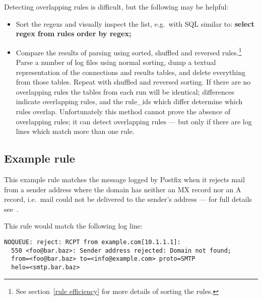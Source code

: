 \documentclass[a4paper,12pt,draft]{article}
\begin{document}
Detecting overlapping rules is difficult, but the following may be helpful:

\begin{itemize}

    \item Sort the regexs and visually inspect the list, e.g.\ with SQL
        similar to: \textbf{select regex from rules order by regex;}

    \item Compare the results of parsing using sorted, shuffled and
        reversed rules.\footnote{See section~\ref{rule efficiency} for more
        details of sorting the rules.}  Parse a number of log files using
        normal sorting, dump a textual representation of the connections
        and results tables, and delete everything from those tables.
        Repeat with shuffled and reversed sorting.  If there are no
        overlapping rules the tables from each run will be identical;
        differences indicate overlapping rules, and the rule\_ids which
        differ determine which rules overlap.  Unfortunately this method
        cannot prove the absence of overlapping rules; it can detect
        overlapping rules --- but only if there are log lines which match
        more than one rule.

\end{itemize}

\subsection{Example rule}

This example rule matches the message logged by Postfix when it rejects
mail from a sender address where the domain has neither an MX record nor an
A record, i.e.\ mail could not be delivered to the sender's address --- for
full details see~\cite{reject-unknown-sender-domain}.

This rule would match the following log line:

\begin{verbatim}
NOQUEUE: reject: RCPT from example.com[10.1.1.1]: 
  550 <foo@bar.baz>: Sender address rejected: Domain not found;
  from=<foo@bar.baz> to=<info@example.com> proto=SMTP
  helo=<smtp.bar.baz>
\end{verbatim}
\end{document}
